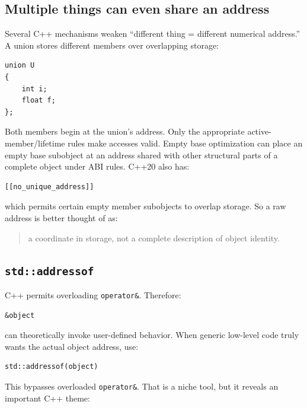 \subsection{Multiple things can even share an address}\label{01-foundations-i-ch002-multiple-things-can-even-share-an-address}

Several C++ mechanisms weaken ``different thing = different numerical address.'' A union stores different members over overlapping storage:

\begin{verbatim}
union U
{
    int i;
    float f;
};
\end{verbatim}

Both members begin at the union's address. Only the appropriate active-member/lifetime rules make accesses valid. Empty base optimization can place an empty base subobject at an address shared with other structural parts of a complete object under ABI rules. C++20 also has:

\begin{verbatim}
[[no_unique_address]]
\end{verbatim}

which permits certain empty member subobjects to overlap storage. So a raw address is better thought of as:

\begin{quote}
a coordinate in storage, not a complete description of object identity.
\end{quote}

\subsection{\texorpdfstring{\texttt{std::addressof}}{std::addressof}}\label{01-foundations-i-ch002-stdaddressof}

C++ permits overloading \texttt{operator\&}. Therefore:

\begin{verbatim}
&object
\end{verbatim}

can theoretically invoke user-defined behavior. When generic low-level code truly wants the actual object address, use:

\begin{verbatim}
std::addressof(object)
\end{verbatim}

This bypasses overloaded \texttt{operator\&}. That is a niche tool, but it reveals an important C++ theme:

